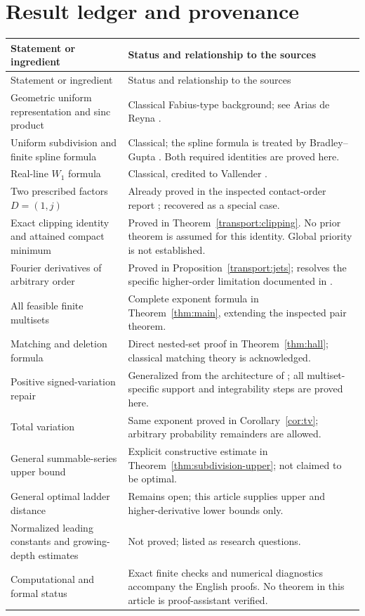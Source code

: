 \documentclass[11pt,letterpaper]{article}
\theoremstyle{definition}
\theoremstyle{remark}
\begin{document}
\clearpage
\appendix
\section{Result ledger and provenance}\label{sec:ledger}

\begin{longtable}{>{\raggedright\arraybackslash}p{}>{\raggedright\arraybackslash}p{}}
\toprule
Statement or ingredient & Status and relationship to the sources\\
\midrule
\endfirsthead
\toprule
Statement or ingredient & Status and relationship to the sources\\
\midrule
\endhead
Geometric uniform representation and sinc product & Classical Fabius-type background; see Arias de Reyna \cite{Arias}.\\
Uniform subdivision and finite spline formula & Classical; the spline formula is treated by Bradley--Gupta \cite{BradleyGupta}. Both required identities are proved here.\\
Real-line $W_1$ formula & Classical, credited to Vallender \cite{Vallender}.\\
Two prescribed factors $D=(1,j)$ & Already proved in the inspected contact-order report \cite{repo-contact}; recovered as a special case.\\
Exact clipping identity and attained compact minimum & Proved in Theorem~\ref{transport:clipping}. No prior theorem is assumed for this identity. Global priority is not established.\\
Fourier derivatives of arbitrary order & Proved in Proposition~\ref{transport:jets}; resolves the specific higher-order limitation documented in \cite{repo-arithmetic}.\\
All feasible finite multisets & Complete exponent formula in Theorem~\ref{thm:main}, extending the inspected pair theorem.\\
Matching and deletion formula & Direct nested-set proof in Theorem~\ref{thm:hall}; classical matching theory is acknowledged.\\
Positive signed-variation repair & Generalized from the architecture of \cite{repo-contact}; all multiset-specific support and integrability steps are proved here.\\
Total variation & Same exponent proved in Corollary~\ref{cor:tv}; arbitrary probability remainders are allowed.\\
General summable-series upper bound & Explicit constructive estimate in Theorem~\ref{thm:subdivision-upper}; not claimed to be optimal.\\
General optimal ladder distance & Remains open; this article supplies upper and higher-derivative lower bounds only.\\
Normalized leading constants and growing-depth estimates & Not proved; listed as research questions.\\
Computational and formal status & Exact finite checks and numerical diagnostics accompany the English proofs. No theorem in this article is proof-assistant verified.\\
\bottomrule
\end{longtable}
\end{document}
